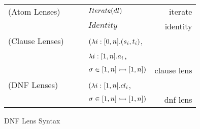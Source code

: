 \begin{figure}
\begin{tabular}{l@{\ }l@{\ }c@{\ }l@{\ }r}

(Atom Lenses) &\AtomLens{} & \GEq{} & $Iterate(dl)$ & iterate\\
& & & \GBar{} $Identity$ & identity\\
(Clause Lenses) &\ClauseLens{} & \GEq{} &
$(\lambda i:[0,n].(s_i,t_i)$,\\
& & & $\lambda i:[1,n].a_i$,\\
& & & $\sigma \in [1,n] \rightarrowtail [1,n])$ & clause lens\\
(DNF Lenses)& \DNFLens{} & \GEq{} & $(\lambda i:[1,n].cl_i$,\\
& & & $\sigma \in [1,n] \rightarrowtail [1,n])$ & dnf lens\\
\end{tabular}
\caption{DNF Lens Syntax}
\label{fig:dnf-lens-syntax}
\end{figure}
